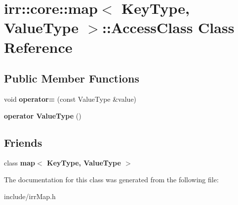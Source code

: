 \hypertarget{classirr_1_1core_1_1map_1_1AccessClass}{}\section{irr\+:\+:core\+:\+:map$<$ Key\+Type, Value\+Type $>$\+:\+:Access\+Class Class Reference}
\label{classirr_1_1core_1_1map_1_1AccessClass}
\subsection*{Public Member Functions}
\begin{DoxyCompactItemize}
\item 
void {\bfseries operator=} (const Value\+Type \&value)\hypertarget{classirr_1_1core_1_1map_1_1AccessClass_a52dab87607d16e8189936113da5ee0e8}{}\label{classirr_1_1core_1_1map_1_1AccessClass_a52dab87607d16e8189936113da5ee0e8}

\item 
{\bfseries operator Value\+Type} ()\hypertarget{classirr_1_1core_1_1map_1_1AccessClass_aeb2c9c9e3e957ad1b5393f13f5c6a80d}{}\label{classirr_1_1core_1_1map_1_1AccessClass_aeb2c9c9e3e957ad1b5393f13f5c6a80d}

\end{DoxyCompactItemize}
\subsection*{Friends}
\begin{DoxyCompactItemize}
\item 
class {\bfseries map$<$ Key\+Type, Value\+Type $>$}\hypertarget{classirr_1_1core_1_1map_1_1AccessClass_a685d19b6671d09fc9f155f68aca75d6f}{}\label{classirr_1_1core_1_1map_1_1AccessClass_a685d19b6671d09fc9f155f68aca75d6f}

\end{DoxyCompactItemize}


The documentation for this class was generated from the following file\+:\begin{DoxyCompactItemize}
\item 
include/irr\+Map.\+h\end{DoxyCompactItemize}
